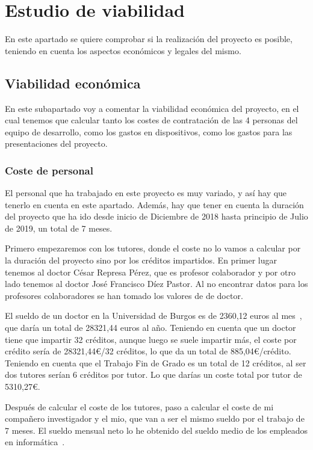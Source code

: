 \section{Estudio de viabilidad}
En este apartado se quiere comprobar si la realización del proyecto es posible, teniendo en cuenta los aspectos económicos y legales del mismo.
\subsection{Viabilidad económica}
En este subapartado voy a comentar la viabilidad económica del proyecto, en el cual tenemos que calcular tanto los costes de contratación de las 4 personas del equipo de desarrollo, como los gastos en dispositivos, como los gastos para las presentaciones del proyecto.

\subsubsection{Coste de personal}
El personal que ha trabajado en este proyecto es muy variado, y así hay que tenerlo en cuenta en este apartado. Además, hay que tener en cuenta la duración del proyecto que ha ido desde inicio de Diciembre de 2018 hasta principio de Julio de 2019, un total de 7 meses.

Primero empezaremos con los tutores, donde el coste no lo vamos a calcular por la duración del proyecto sino por los créditos impartidos. En primer lugar tenemos al doctor César Represa Pérez, que es profesor colaborador y por otro lado tenemos al doctor José Francisco Díez Pastor. Al no encontrar datos para los profesores colaboradores se han tomado los valores de de doctor.

El sueldo de un doctor en la Universidad de Burgos es de 2360,12 euros al mes~\cite{sueldos}, que daría un total de 28321,44 euros al año. Teniendo en cuenta que un doctor tiene que impartir 32 créditos, aunque luego se suele impartir más, el coste por crédito sería de 28321,44\euro/32 créditos, lo que da un total de 885,04\euro/crédito. Teniendo en cuenta que el Trabajo Fin de Grado es un total de 12 créditos, al ser dos tutores serían 6 créditos por tutor. Lo que darías un coste total por tutor de 5310,27\euro.

Después de calcular el coste de los tutores, paso a calcular el coste de mi compañero investigador y el mio, que van a ser el mismo sueldo por el trabajo de 7 meses. El sueldo mensual neto lo he obtenido del sueldo medio de los empleados en informática~\cite{salario}.

